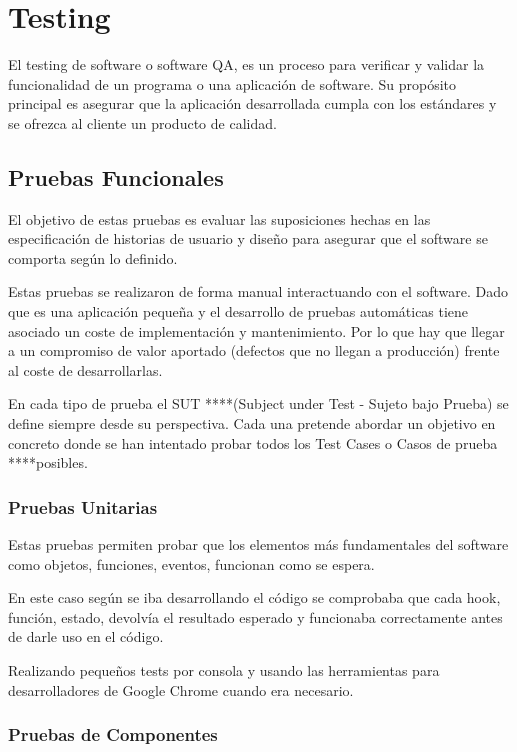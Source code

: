 \documentclass[12pt,twoside,titlepage]{report}
\begin{document}
\section{Testing}

El testing de software o software QA, es un proceso para verificar y validar la funcionalidad de un programa o una aplicación de software. Su propósito principal es asegurar que la aplicación desarrollada cumpla con los estándares y se ofrezca al cliente un producto de calidad.

\subsection{Pruebas Funcionales}

El objetivo de estas pruebas es evaluar las suposiciones hechas en las especificación de historias de usuario y diseño para asegurar que el software se comporta según lo definido.

Estas pruebas se realizaron de forma manual interactuando con el software. Dado que es una aplicación pequeña y el desarrollo de pruebas automáticas tiene asociado un coste de implementación y mantenimiento. Por lo que hay que llegar a un compromiso de valor aportado (defectos que no llegan a producción) frente al coste de desarrollarlas. 

En cada tipo de prueba el SUT ****(Subject under Test - Sujeto bajo Prueba) se define siempre desde su perspectiva. Cada una pretende abordar un objetivo en concreto donde se han intentado probar todos los Test Cases o Casos de prueba ****posibles.

\subsubsection{Pruebas Unitarias}

Estas pruebas permiten probar que los elementos más fundamentales del software como objetos, funciones, eventos, funcionan como se espera. 

En este caso según se iba desarrollando el código se comprobaba que cada hook, función, estado, devolvía el resultado esperado y funcionaba correctamente antes de darle uso en el código. 

Realizando pequeños tests por consola y usando las herramientas para desarrolladores de Google Chrome cuando era necesario.

\subsubsection{Pruebas de Componentes}
\end{document}
